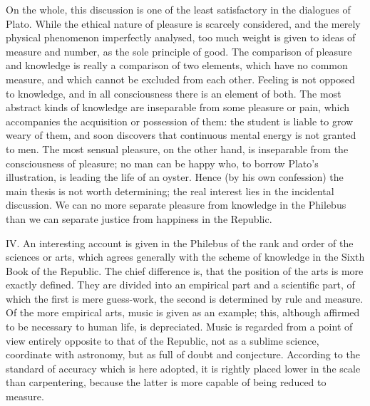 \documentclass[11pt,letter]{article}
\begin{document}
\par  On the whole, this discussion is one of the least satisfactory in the dialogues of Plato. While the ethical nature of pleasure is scarcely considered, and the merely physical phenomenon imperfectly analysed, too much weight is given to ideas of measure and number, as the sole principle of good. The comparison of pleasure and knowledge is really a comparison of two elements, which have no common measure, and which cannot be excluded from each other. Feeling is not opposed to knowledge, and in all consciousness there is an element of both. The most abstract kinds of knowledge are inseparable from some pleasure or pain, which accompanies the acquisition or possession of them: the student is liable to grow weary of them, and soon discovers that continuous mental energy is not granted to men. The most sensual pleasure, on the other hand, is inseparable from the consciousness of pleasure; no man can be happy who, to borrow Plato's illustration, is leading the life of an oyster. Hence (by his own confession) the main thesis is not worth determining; the real interest lies in the incidental discussion. We can no more separate pleasure from knowledge in the Philebus than we can separate justice from happiness in the Republic.

\par  IV. An interesting account is given in the Philebus of the rank and order of the sciences or arts, which agrees generally with the scheme of knowledge in the Sixth Book of the Republic. The chief difference is, that the position of the arts is more exactly defined. They are divided into an empirical part and a scientific part, of which the first is mere guess-work, the second is determined by rule and measure. Of the more empirical arts, music is given as an example; this, although affirmed to be necessary to human life, is depreciated. Music is regarded from a point of view entirely opposite to that of the Republic, not as a sublime science, coordinate with astronomy, but as full of doubt and conjecture. According to the standard of accuracy which is here adopted, it is rightly placed lower in the scale than carpentering, because the latter is more capable of being reduced to measure.
\end{document}
